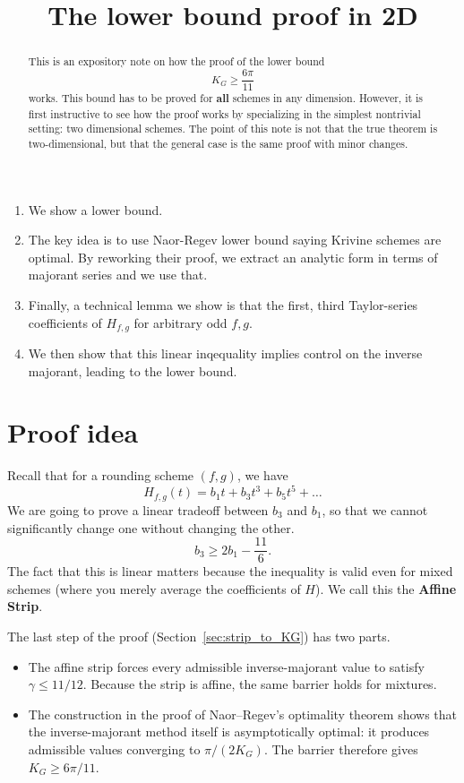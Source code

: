 \documentclass[11pt]{article}
\title{The lower bound proof in 2D}
\author{}
\begin{document}
\maketitle

\begin{abstract}
\noindent This is an expository note on how the proof of the lower bound
\[
        K_G\ge \frac{6\pi}{11}
\]
works. This bound has to be proved for \textbf{all} schemes in any dimension. However, it is first instructive to see how the proof works by specializing in the simplest nontrivial setting: two dimensional schemes.  The point of this note is not that the true theorem is two-dimensional, but that the general case is the same proof with minor changes. 
\end{abstract}

\tableofcontents

\begin{enumerate}
    \item We show a lower bound.
    \item The key idea is to use Naor-Regev lower bound saying Krivine schemes are optimal. By reworking their proof, we extract an analytic form in terms of majorant series and we use that.
    \item Finally, a technical lemma we show is that the first, third Taylor-series coefficients of $H_{f,g}$ for arbitrary odd $f,g$. 
    \item We then show that this linear inqequality implies control on the inverse majorant, leading to the lower bound. 
\end{enumerate}

\section*{Proof idea}

 Recall that for a rounding scheme $(f, g)$, we have \[H_{f,g}(t) = b_1 t + b_3 t^3 + b_5 t^5 + \ldots\]
We are going to prove a linear tradeoff between $b_3$ and $b_1$, so that we cannot significantly change one without changing the other. 
\[
        b_3 \ge 2b_1 -\frac{11}{6}.
\]
The fact that this is linear matters because the inequality is valid even for mixed schemes (where you merely average the coefficients of $H$). We call this the \textbf{Affine Strip}.

The last step of the proof (Section~\ref{sec:strip_to_KG}) has two parts.
\begin{itemize}
    \item The affine strip forces every admissible inverse-majorant value to satisfy $\gamma\le11/12$.  Because the strip is affine, the same barrier holds for mixtures.
    \item The construction in the proof of Naor--Regev's optimality theorem shows that the inverse-majorant method itself is asymptotically optimal: it produces admissible values converging to $\pi/(2K_G)$.  The barrier therefore gives $K_G\ge6\pi/11$.
\end{itemize}
\end{document}
